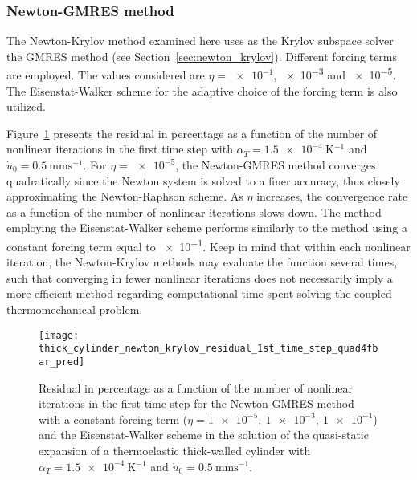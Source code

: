 \FloatBarrier

\subsubsection{Newton-GMRES method}

The Newton-Krylov method examined here uses as the Krylov subspace solver the GMRES method (see Section~\ref{sec:newton_krylov}).
Different forcing terms are employed.
The values considered are \(\eta=\num[print-unity-mantissa=false]{e-1}\), \num[print-unity-mantissa=false]{e-3} and \num[print-unity-mantissa=false]{e-5}.
The Eisenstat-Walker scheme for the adaptive choice of the forcing term is also utilized.

Figure~\ref{fig:thick_cylinder_newton_krylov_residual_1st_time_step_quad4fbar_pred} presents the residual in percentage as a function of the number of nonlinear iterations in the first time step with \(\alpha_T=\SI{1.5e-4}{\kelvin^{-1}}\) and \(\dot u_0 =\SI{0.5}{\milli\meter\second^{-1}}\).
For \(\eta=\num{e-5}\), the Newton-GMRES method converges quadratically since the Newton system is solved to a finer accuracy, thus closely approximating the Newton-Raphson scheme.
As \(\eta\) increases, the convergence rate as a function of the number of nonlinear iterations slows down.
The method employing the Eisenstat-Walker scheme performs similarly to the method using a constant forcing term equal to \num{e-1}.
Keep in mind that within each nonlinear iteration, the Newton-Krylov methods may evaluate the function several times, such that converging in fewer nonlinear iterations does not necessarily imply a more efficient method regarding computational time spent solving the coupled thermomechanical problem.

\begin{figure}
 \centering
 \texttt{[image: thick\_cylinder\_newton\_krylov\_residual\_1st\_time\_step\_quad4fbar\_pred]}
 \caption{Residual in percentage as a function of the number of nonlinear iterations in the first time step for the Newton-GMRES method with a constant forcing term (\(\eta=\num{1e-5},\ \num{1e-3},\ \num{1e-1}\)) and the Eisenstat-Walker scheme in the solution of the quasi-static expansion of a thermoelastic thick-walled cylinder with \(\alpha_T=\SI{1.5e-4}{\kelvin^{-1}}\) and \(\dot u_0 =\SI{0.5}{\milli\meter\second^{-1}}\).}
\label{fig:thick_cylinder_newton_krylov_residual_1st_time_step_quad4fbar_pred}
\end{figure}

